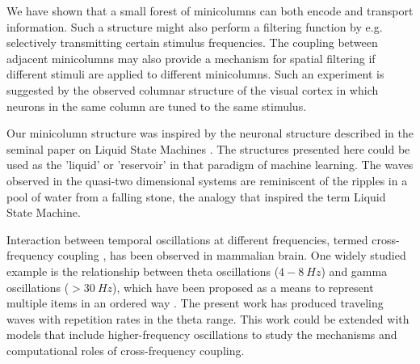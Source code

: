 We have shown that a small forest of minicolumns can both encode and transport information.
Such a structure might also perform a filtering function by e.g. selectively transmitting certain stimulus frequencies.
The coupling between adjacent minicolumns may also provide a mechanism for spatial filtering if different stimuli are applied to different minicolumns. 
Such an experiment is suggested by the observed columnar structure of the visual cortex in which neurons in the same column are tuned to the same stimulus.

Our minicolumn structure was inspired by the neuronal structure described in the seminal paper on Liquid State Machines \citep{maass2002}.
The structures presented here could be used as the 'liquid' or 'reservoir' in that paradigm of machine learning.
The waves observed in the quasi-two dimensional systems are reminiscent of the ripples in a pool of water from a falling stone, 
the analogy that inspired the term Liquid State Machine.

Interaction between temporal oscillations at different frequencies, termed cross-frequency coupling \citep{Hyafil2015}, has been observed in mammalian brain.
One widely studied example is the relationship between theta oscillations ($4-8~Hz$) and gamma oscillations ($>30~Hz$), 
which have been proposed as a means to represent multiple items in an ordered way \citep{Lisman2013}. 
The present work has produced traveling waves with repetition rates in the theta range.
This work could be extended with models that include higher-frequency oscillations to study the mechanisms and computational roles of cross-frequency coupling.

\endinput
